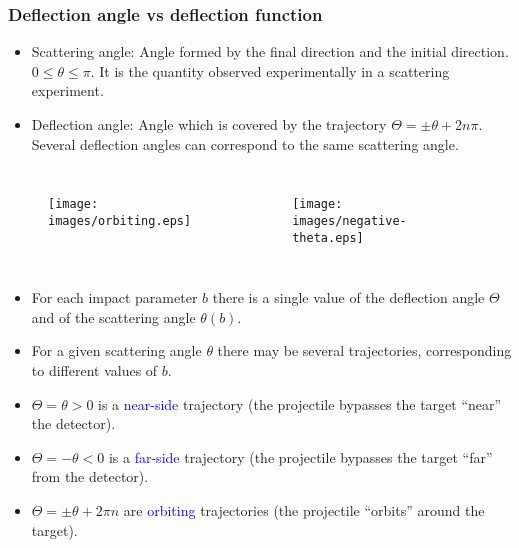 \documentclass[english,10pt]{beamer}
\newcommand{\gitem}[1]{\item {\textcolor{deepcarmine}{  #1}}}
\newcommand{\images}{images}
\newcommand{\miframebox}[1]{\psshadowbox[fillcolor=lightgreen,fillstyle=solid,linecolor=red,framearc=0.25]{\textcolor{brick}{  #1 }}}
\begin{document}
\begin{frame}
\frametitle{Deflection angle vs deflection function}


\begin{itemize}
\gitem{Scattering angle:} Angle formed by the final direction and the initial direction. $0 \leq \theta \leq \pi$. It is the quantity observed experimentally in a scattering experiment.
\gitem{Deflection angle:} Angle which is covered by the trajectory $\Theta = \pm \theta + 2n \pi$. Several deflection angles can correspond to the same scattering angle.
\end{itemize}


\begin{columns}[t]
\begin{figure}{\par \resizebox*{0.85\textwidth}{!}
{\texttt{[image: \\images/orbiting.eps]}} \par}
\end{figure}
\begin{figure}{\par \resizebox*{0.85\textwidth}{!}
{\texttt{[image: \\images/negative-theta.eps]}} \par}
\end{figure}
\end{columns}%

\bigskip

\footnotesize

\begin{itemize}

\item[\ding{43}] For each impact parameter {\blue $b$} there is a single value of the deflection angle $\Theta$ and of the scattering angle {\blue $\theta(b)$}.
\item[\ding{43}] For a given scattering angle {\blue $\theta$} there may be  several trajectories, corresponding to different values of {\blue $b$}.
\item[\ding{43}] $\Theta= \theta > 0$ is a  \textcolor{blue}{near-side} trajectory (the projectile bypasses the target ``near'' the detector).  
\item[\ding{43}] $\Theta = - \theta <0$ is a \textcolor{blue}{far-side} trajectory  (the projectile bypasses the target ``far'' from the detector). 
\item[\ding{43}] $\Theta = \pm \theta + 2 \pi n$ are \textcolor{blue}{orbiting} trajectories  (the projectile ``orbits'' around the target). 
\end{itemize}


\end{frame}
\end{document}
